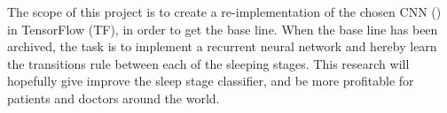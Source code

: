 The scope of this project is to create a re-implementation of the chosen CNN (\cite{main_ar}) in TensorFlow (TF), in order to get the base line. When the base line has been archived, the task is to implement a recurrent neural network and hereby learn the transitions rule between each of the sleeping stages. 
This research will hopefully give improve the sleep stage classifier, and be more profitable for patients and doctors around the world. 
